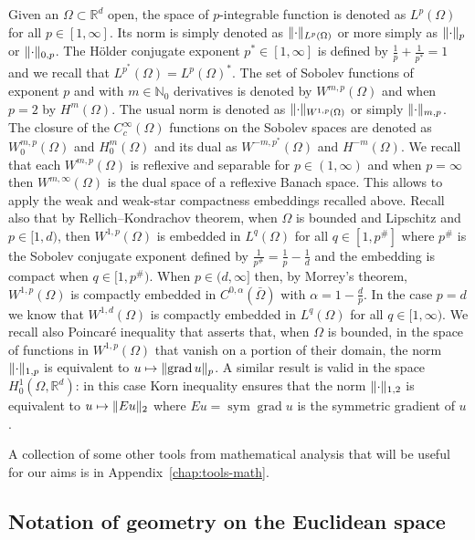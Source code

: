 \documentclass[a4paper,10pt,twoside]{amsbook}
\numberwithin{section}{chapter}
\numberwithin{equation}{chapter}
\theoremstyle{definition}
\DeclareMathOperator{\sym}{sym}
\DeclareMathOperator{\grad}{grad}
\DeclarePairedDelimiter{\norm}{\lVert}{\rVert}
\begin{document}
Given an $\Omega\subset\mathbb{R}^d$ open, the space of $p$-integrable function is denoted as $L^p(\Omega)$ for all $p\in[1,\infty]$. Its norm is simply denoted as $\norm{\cdot}_{L^p(\Omega)}$ or more simply as $\norm{\cdot}_p$ or $\norm{\cdot}_{0,p}$. The H\"older conjugate exponent $p^*\in[1,\infty]$ is defined by $\frac{1}{p}+\frac{1}{p^*}=1$ and we recall that $L^{p^*}(\Omega)=L^p(\Omega)^*$. The set of Sobolev functions of exponent $p$ and with $m\in\mathbb{N}_0$ derivatives is denoted by $W^{m,p}(\Omega)$ and when $p=2$ by $H^m(\Omega)$. The usual norm is denoted as $\norm{\cdot}_{W^{1,p}(\Omega)}$ or simply $\norm{\cdot}_{m,p}$. The closure of the $C^\infty_c(\Omega)$ functions on the Sobolev spaces are denoted as $W^{m,p}_0(\Omega)$ and $H^m_0(\Omega)$ and its dual as $W^{-m,p^*}(\Omega)$ and $H^{-m}(\Omega)$. We recall that each $W^{m,p}(\Omega)$ is reflexive and separable for $p\in(1,\infty)$ and when $p=\infty$ then $W^{m,\infty}(\Omega)$ is the dual space of a reflexive Banach space. This allows to apply the weak and weak-star compactness embeddings recalled above. Recall also that by Rellich--Kondrachov theorem, when $\Omega$ is bounded and Lipschitz and $p\in[1,d)$, then $W^{1,p}(\Omega)$ is embedded in $L^q(\Omega)$ for all $q\in[1,p^\#]$ where $p^\#$ is the Sobolev conjugate exponent defined by $\frac{1}{p^\#}=\frac{1}{p}-\frac{1}{d}$ and the embedding is compact when $q\in[1,p^\#)$. When $p\in(d,\infty]$ then, by Morrey's theorem, $W^{1,p}(\Omega)$ is compactly embedded in $C^{0,\alpha}(\bar\Omega)$ with $\alpha=1-\frac{d}{p}$. In the case $p=d$ we know that $W^{1,d}(\Omega)$ is compactly embedded in $L^q(\Omega)$ for all $q\in[1,\infty)$. We recall also Poincaré inequality that asserts that, when $\Omega$ is bounded, in the space of functions in $W^{1,p}(\Omega)$ that vanish on a portion of their domain, the norm $\norm{\cdot}_{1,p}$ is equivalent to $u\mapsto\norm{\grad u}_p$. A similar result is valid in the space $H^1_0(\Omega,\mathbb{R}^d)$: in this case Korn inequality ensures that the norm $\norm{\cdot}_{1,2}$ is equivalent to $u\mapsto\norm{Eu}_2$ where $Eu=\sym\grad u$ is the symmetric gradient of $u$.

A collection of some other tools from mathematical analysis that will be useful for our aims is in Appendix~\ref{chap:tools-math}.

\subsection*{Notation of geometry on the Euclidean space}
\end{document}
